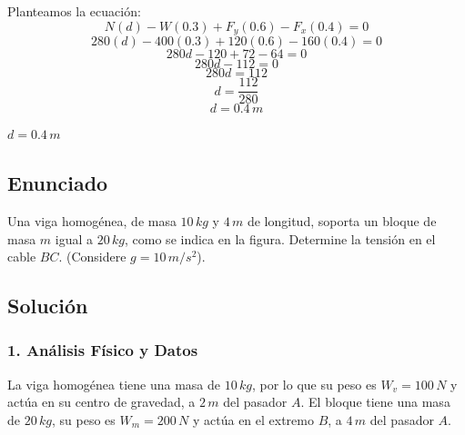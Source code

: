\documentclass[12pt, a4paper]{article}
\begin{document}
Planteamos la ecuación:
$$N(d) - W(0.3) + F_y(0.6) - F_x(0.4) = 0$$
$$280(d) - 400(0.3) + 120(0.6) - 160(0.4) = 0$$
$$280d - 120 + 72 - 64 = 0$$
$$280d - 112 = 0$$
$$280d = 112$$
$$d = \frac{112}{280}$$
$$d = 0.4 \, \si{m}$$

\begin{tcolorbox}[colback=green!5!white, colframe=green!50!black, title=Respuesta Final]
\centering \Large $d = 0.4 \, \si{m}$
\end{tcolorbox}

\newpage

\subsection*{Enunciado}
Una viga homogénea, de masa $10 \, \si{kg}$ y $4 \, \si{m}$ de longitud, soporta un bloque de masa $m$ igual a $20 \, \si{kg}$, como se indica en la figura. Determine la tensión en el cable $BC$. (Considere $g=10\,\si{m/s^2}$).

\begin{center}
\end{center}

\subsection*{Solución}

\subsubsection*{1. Análisis Físico y Datos}
La viga homogénea tiene una masa de $10 \, \si{kg}$, por lo que su peso es $W_v = 100 \, \si{N}$ y actúa en su centro de gravedad, a $2 \, \si{m}$ del pasador $A$. 
El bloque tiene una masa de $20 \, \si{kg}$, su peso es $W_m = 200 \, \si{N}$ y actúa en el extremo $B$, a $4 \, \si{m}$ del pasador $A$.
\end{document}
